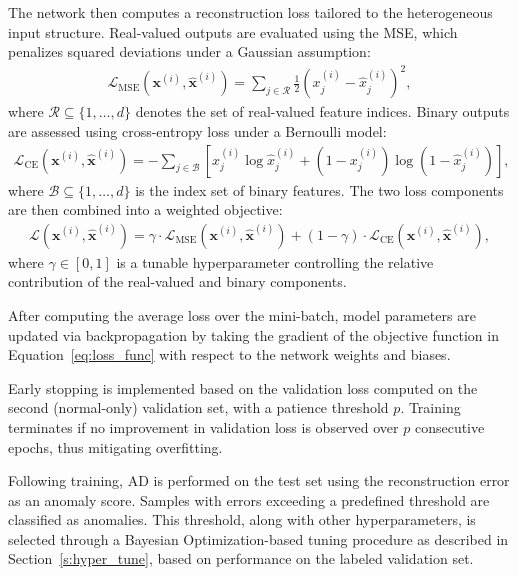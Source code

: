 The network then computes a reconstruction loss tailored to the heterogeneous input structure. Real-valued outputs are evaluated using the MSE, which penalizes squared deviations under a Gaussian assumption:
\begin{align} \label{eq:mse}
\mathcal{L}_{\text{MSE}}(\mathbf{x}^{(i)}, \hat{\mathbf{x}}^{(i)}) = \sum_{j \in \mathcal{R}} \frac{1}{2} \left(x_j^{(i)} - \hat{x}_j^{(i)}\right)^2,
\end{align}
where $\mathcal{R} \subseteq \{1, \dots, d\}$ denotes the set of real-valued feature indices. Binary outputs are assessed using cross-entropy loss under a Bernoulli model:
\begin{align} \label{eq:cee}
\mathcal{L}_{\text{CE}}(\mathbf{x}^{(i)}, \hat{\mathbf{x}}^{(i)}) = - \sum_{j \in \mathcal{B}} \left[ x_j^{(i)} \log \hat{x}_j^{(i)} + (1 - x_j^{(i)}) \log (1 - \hat{x}_j^{(i)}) \right],
\end{align}
where $\mathcal{B} \subseteq \{1, \dots, d\}$ is the index set of binary features. The two loss components are then combined into a weighted objective:
\begin{align} \label{eq:weight_loss}
\mathcal{L}(\mathbf{x}^{(i)}, \hat{\mathbf{x}}^{(i)}) = \gamma \cdot \mathcal{L}_{\text{MSE}}(\mathbf{x}^{(i)}, \hat{\mathbf{x}}^{(i)}) + (1 - \gamma) \cdot \mathcal{L}_{\text{CE}}(\mathbf{x}^{(i)}, \hat{\mathbf{x}}^{(i)}),
\end{align}
where $\gamma \in [0, 1]$ is a tunable hyperparameter controlling the relative contribution of the real-valued and binary components.

After computing the average loss over the mini-batch, model parameters are updated via backpropagation by taking the gradient of the objective function in Equation~\ref{eq:loss_func} with respect to the network weights and biases.

Early stopping is implemented based on the validation loss computed on the second (normal-only) validation set, with a patience threshold $p$. Training terminates if no improvement in validation loss is observed over $p$ consecutive epochs, thus mitigating overfitting.

Following training, AD is performed on the test set using the reconstruction error as an anomaly score. Samples with errors exceeding a predefined threshold are classified as anomalies. This threshold, along with other hyperparameters, is selected through a Bayesian Optimization-based tuning procedure as described in Section~\ref{s:hyper_tune}, based on performance on the labeled validation set.

